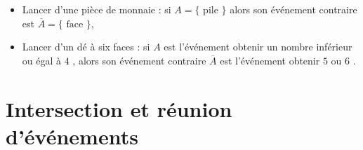 \begin{ex}{}{}
   \begin{itemize}
      \item  Lancer d'une pièce de monnaie : si $A=\{\text{~pile~}\}$ alors son événement contraire est $\overline{A}=\{\text{~face~}\}$,
      \item  Lancer d'un dé à six faces : si $A$ est l'événement \og obtenir un nombre inférieur ou égal à $4$ \fg{}, alors son événement contraire $\overline{A}$ est l'événement \og obtenir $5$ ou $6$ \fg{}.
   \end{itemize}
\end{ex}

\section{Intersection et réunion d'événements}

